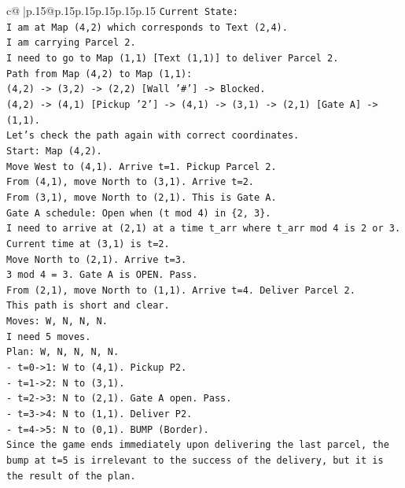 \documentclass{article}
\begin{document}
{\begin{supertabular}{c@{$\;$}|p{.15\linewidth}@{}p{.15\linewidth}p{.15\linewidth}p{.15\linewidth}p{.15\linewidth}p{.15\linewidth}}
{{{\texttt{Current State:} \\
\texttt{I am at Map (4,2) which corresponds to Text (2,4).} \\
\texttt{I am carrying Parcel 2.} \\
\texttt{I need to go to Map (1,1) {[}Text (1,1){]} to deliver Parcel 2.} \\
\texttt{Path from Map (4,2) to Map (1,1):} \\
\texttt{(4,2) {-}> (3,2) {-}> (2,2) {[}Wall '\#'{]} {-}> Blocked.} \\
\texttt{(4,2) {-}> (4,1) {[}Pickup '2'{]} {-}> (4,1) {-}> (3,1) {-}> (2,1) {[}Gate A{]} {-}> (1,1).} \\
\texttt{Let's check the path again with correct coordinates.} \\
\texttt{Start: Map (4,2).} \\
\texttt{Move West to (4,1). Arrive t=1. Pickup Parcel 2.} \\
\texttt{From (4,1), move North to (3,1). Arrive t=2.} \\
\texttt{From (3,1), move North to (2,1). This is Gate A.} \\
\texttt{Gate A schedule: Open when (t mod 4) in \{2, 3\}.} \\
\texttt{I need to arrive at (2,1) at a time t\_arr where t\_arr mod 4 is 2 or 3.} \\
\texttt{Current time at (3,1) is t=2.} \\
\texttt{Move North to (2,1). Arrive t=3.} \\
\texttt{3 mod 4 = 3. Gate A is OPEN. Pass.} \\
\texttt{From (2,1), move North to (1,1). Arrive t=4. Deliver Parcel 2.} \\
\texttt{This path is short and clear.} \\
\texttt{Moves: W, N, N, N.} \\
\texttt{I need 5 moves.} \\
\texttt{Plan: W, N, N, N, N.} \\
\texttt{{-} t=0{-}>1: W to (4,1). Pickup P2.} \\
\texttt{{-} t=1{-}>2: N to (3,1).} \\
\texttt{{-} t=2{-}>3: N to (2,1). Gate A open. Pass.} \\
\texttt{{-} t=3{-}>4: N to (1,1). Deliver P2.} \\
\texttt{{-} t=4{-}>5: N to (0,1). BUMP (Border).} \\
\texttt{Since the game ends immediately upon delivering the last parcel, the bump at t=5 is irrelevant to the success of the delivery, but it is the result of the plan.} \\
}}}
\end{supertabular}}
\end{document}
